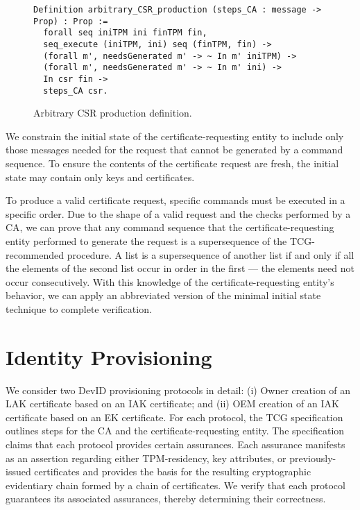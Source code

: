 \documentclass[runningheads]{llncs}
\begin{document}
\begin{figure}[hbtp]
  \vspace{-\medskipamount}
  \vspace{-\medskipamount}
  \begin{lstlisting}[language=Coq]
Definition arbitrary_CSR_production (steps_CA : message -> Prop) : Prop :=
  forall seq iniTPM ini finTPM fin,
  seq_execute (iniTPM, ini) seq (finTPM, fin) ->
  (forall m', needsGenerated m' -> ~ In m' iniTPM) ->
  (forall m', needsGenerated m' -> ~ In m' ini) ->
  In csr fin ->
  steps_CA csr.
  \end{lstlisting}
  \caption{Arbitrary CSR production definition.}
  \label{fig:csr-production}
\end{figure}

We constrain the initial state of the certificate-requesting entity to
include only those messages needed for the request that cannot be
generated by a command sequence.  To ensure the contents of
the certificate request are fresh, the initial state may contain only
keys and certificates.

To produce a valid certificate request, specific commands
must be executed in a specific order.  Due to the shape of a valid
request and the checks performed by a CA, we can prove that any
command sequence that the certificate-requesting entity performed to
generate the request is a supersequence of the TCG-recommended procedure. 
A list is a supersequence of another list if and only if all the elements 
of the second list occur in order in the first --- the elements need not
occur consecutively.  With this knowledge of the
certificate-requesting entity's behavior, we can apply an abbreviated
version of the minimal initial state technique to complete
verification.

\section{Identity Provisioning}

We consider two DevID provisioning protocols in detail: (i) Owner
creation of an LAK certificate based on an IAK certificate; and (ii)
OEM creation of an IAK certificate based on an EK certificate. For
each protocol, the TCG specification outlines steps for the CA and the
certificate-requesting entity. The specification claims that each
protocol provides certain assurances. Each assurance manifests as
an assertion regarding either TPM-residency, key attributes, or
previously-issued certificates and provides the basis for the
resulting cryptographic evidentiary chain formed by a chain of
certificates. We verify that each protocol guarantees its associated
assurances, thereby determining their correctness.
\end{document}
